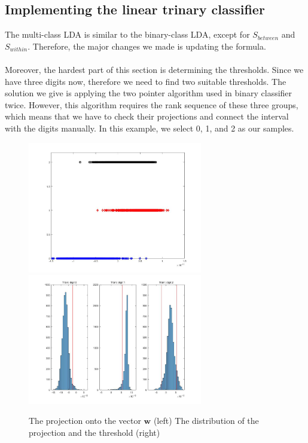 \documentclass{article}
\begin{document}
\subsection{Implementing the linear trinary classifier}
The multi-class LDA is similar to the binary-class LDA, except for $S_{between}$ and $S_{within}$. Therefore, the major changes we made is updating the formula. \\
~\\
Moreover, the hardest part of this section is determining the thresholds. Since we have three digits now, therefore we need to find two suitable thresholds. The solution we give is applying the two pointer algorithm used in binary classifier twice. However, this algorithm requires the rank sequence of these three groups, which means that we have to check their projections and connect the interval with the digits manually. In this example, we select 0, 1, and 2 as our samples.\\
\begin{figure}[h]
    \centerline{\includegraphics[width=3in]{LDA3.jpg}\includegraphics[width=3in]{LDA4.jpg}}
    \caption{The projection onto the vector $\mathbf{w}$ (left) The distribution of the projection and the threshold (right)}
\end{figure}
\end{document}
